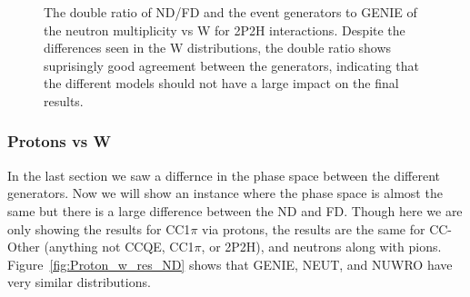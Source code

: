 \documentclass[12pt]{article}
\begin{document}
\begin{figure}
\begin{subfigure}[b]{0.32\textwidth}
\end{subfigure}
\caption{The double ratio of ND/FD and the event generators to GENIE of the neutron multiplicity vs W for 2P2H interactions.  Despite the differences seen in the W distributions, the double ratio shows suprisingly good agreement between the generators, indicating that the different models should not have a large impact on the final results.}
\label{fig:Neutron_w_2p2h_ND_FD_GENIE}
\end{figure}

\subsubsection{Protons vs W}

In the last section we saw a differnce in the phase space between the different generators.  
Now we will show an instance where the phase space is almost the same but there is a large difference between the ND and FD.  
Though here we are only showing the results for CC1$\pi$ via protons, the results are the same for CC-Other (anything not CCQE, CC1$\pi$, or 2P2H), and neutrons along with pions.
Figure~\ref{fig:Proton_w_res_ND} shows that GENIE, NEUT, and NUWRO have very similar distributions.
\end{document}
